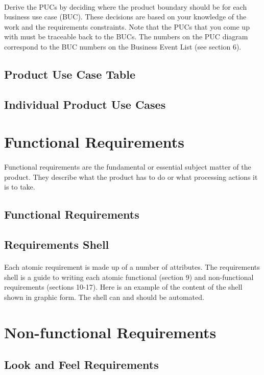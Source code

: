 \documentclass[12pt,a4paper]{article}
\begin{document}
\paragraph{}
Derive the PUCs by deciding where the product boundary should be for each business use case (BUC). These decisions are based on your knowledge of the work and the requirements constraints. Note that the PUCs that you come up with must be traceable back to the BUCs. The numbers on the PUC diagram correspond to the BUC numbers on the Business Event List (see section 6).
\subsection{Product Use Case Table}
\subsection{Individual Product Use Cases}
\pagebreak
\section{Functional Requirements}
\paragraph{}
Functional requirements are the fundamental or essential subject matter of the product. They describe what the product has to do or what processing actions it is to take.
\subsection{Functional Requirements}
\subsection{Requirements Shell}
\paragraph{}
Each atomic requirement is made up of a number of attributes. The requirements shell is a guide to writing each atomic functional (section 9) and non-functional requirements (sections 10-17). Here is an example of the content of the shell shown in graphic form. The shell can and should be automated.
\pagebreak
\section{Non-functional Requirements}
\subsection{Look and Feel Requirements}
\end{document}
